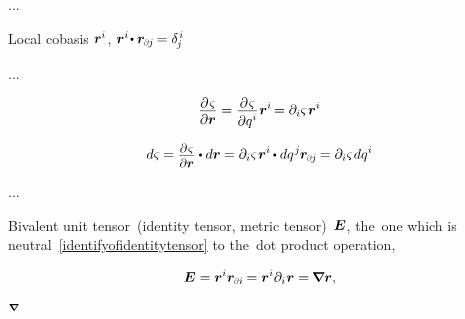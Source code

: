 ...

Local cobasis ${\bm{r}^i}$, ${\locationvector^i \hspace{-0.32ex} \dotp \locationvector_\differentialindex{\hspace{-0.1ex}j} \hspace{-0.22ex} = \delta_{\hspace{-0.15ex}j}^{\hspace{.2ex}i}}$

...

\begin{equation*}
\displaystyle\frac{\raisebox{-0.2em}{$\partial \hspace{.15ex} \varsigma$}}{\partial \locationvector}
=
\displaystyle\frac{\raisebox{-0.2em}{$\partial \hspace{.15ex} \varsigma$}}{\raisebox{-0.1em}{$\partial q^i$}} \hspace{.1ex} \locationvector^i \hspace{-0.25ex}
=
\partial_i \varsigma \hspace{.2ex} \locationvector^i
\end{equation*}

\begin{equation}
d \varsigma \hspace{-0.1ex}
=
\scalebox{0.9}{$ \displaystyle\frac{\raisebox{-0.2em}{$\partial \hspace{.15ex} \varsigma$}}{\partial \locationvector} $} \dotp d\locationvector \hspace{-0.1ex}
=
\partial_i \varsigma \hspace{.2ex} \locationvector^i \hspace{-0.15ex} \dotp dq^{\hspace{.12ex}j} \hspace{-0.1ex} \locationvector_\differentialindex{\hspace{-0.1ex}j} \hspace{-0.2ex}
=
\partial_i \varsigma \hspace{.15ex} dq^i
\end{equation}

...

Bivalent unit tensor~(identity tensor,  metric tensor)~${\hspace{-0.1ex}\bm{E}}$,
the~one which is neutral~\eqref{identifyofidentitytensor} to the~dot product operation,

\nopagebreak\vspace{-0.1em}\begin{equation}
\UnitDyad
= \locationvector^i \locationvector_\differentialindex{i} \hspace{-0.15ex}
= \tikzmark{beginOriginOfNabla} \locationvector^i \partial_i \tikzmark{endOriginOfNabla} \hspace{.1ex} \locationvector = \hspace{-0.16ex} \boldnabla \locationvector ,
\end{equation}
%
{${\scriptstyle \bm{\nabla}\hspace{-0.2ex}}$}

